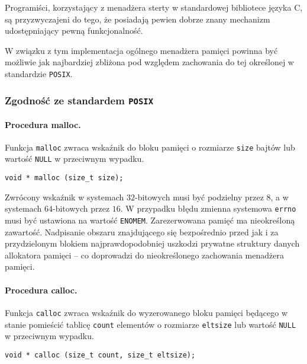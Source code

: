 \documentclass[12pt,a4paper,titlepage,twoside]{mwart}
\begin{document}
\label{PosixMalloc}

Programiści, korzystający z menadżera sterty w standardowej bibliotece języka
C, są przyzwyczajeni do tego, że posiadają pewien dobrze znany mechanizm
udostępniający pewną funkcjonalność.

W związku z tym implementacja ogólnego menadżera pamięci powinna być możliwie
jak najbardziej zbliżona pod względem zachowania do tej określonej w
standardzie \texttt{POSIX}.

\subsubsection{Zgodność ze standardem \texttt{POSIX}}

\paragraph{Procedura malloc.}

Funkcja \texttt{malloc} zwraca wskaźnik do bloku pamięci o rozmiarze
\texttt{size} bajtów lub wartość \texttt{NULL} w przeciwnym wypadku.

\vspace{2ex}
\begin{lstlisting}[caption={Prototyp procedury \texttt{malloc}.}]
void * malloc (size_t size);
\end{lstlisting}

Zwrócony wskaźnik w systemach $32$-bitowych musi być podzielny przez $8$, a w
systemach $64$-bitowych przez $16$. W przypadku błędu zmienna systemowa
\texttt{errno} musi być ustawiona na wartość \texttt{ENOMEM}. Zarezerwowana
pamięć ma nieokreśloną zawartość. Nadpisanie obszaru znajdującego się
bezpośrednio przed jak i za przydzielonym blokiem najprawdopodobniej uszkodzi
prywatne struktury danych allokatora pamięci -- co doprowadzi do nieokreślonego
zachowania menadżera pamięci.

\paragraph{Procedura calloc.}

Funkcja \texttt{calloc} zwraca wskaźnik do wyzerowanego bloku pamięci będącego
w stanie pomieścić tablicę \texttt{count} elementów o rozmiarze
\texttt{eltsize} lub wartość \texttt{NULL} w przeciwnym wypadku.

\vspace{2ex}
\begin{lstlisting}[caption={Prototyp procedury \texttt{calloc}.}]
void * calloc (size_t count, size_t eltsize);
\end{lstlisting}
\end{document}
